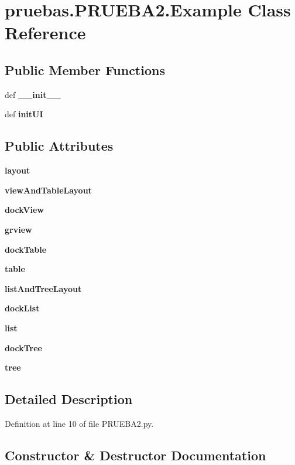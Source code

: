 \section{pruebas.\-P\-R\-U\-E\-B\-A2.\-Example \-Class \-Reference}
\label{classpruebas_1_1_p_r_u_e_b_a2_1_1_example}
\subsection*{\-Public \-Member \-Functions}
\begin{DoxyCompactItemize}
\item 
def {\bf \-\_\-\-\_\-init\-\_\-\-\_\-}
\item 
def {\bf init\-U\-I}
\end{DoxyCompactItemize}
\subsection*{\-Public \-Attributes}
\begin{DoxyCompactItemize}
\item 
{\bf layout}
\item 
{\bf view\-And\-Table\-Layout}
\item 
{\bf dock\-View}
\item 
{\bf grview}
\item 
{\bf dock\-Table}
\item 
{\bf table}
\item 
{\bf list\-And\-Tree\-Layout}
\item 
{\bf dock\-List}
\item 
{\bf list}
\item 
{\bf dock\-Tree}
\item 
{\bf tree}
\end{DoxyCompactItemize}


\subsection{\-Detailed \-Description}


\-Definition at line 10 of file \-P\-R\-U\-E\-B\-A2.\-py.



\subsection{\-Constructor \& \-Destructor \-Documentation}
